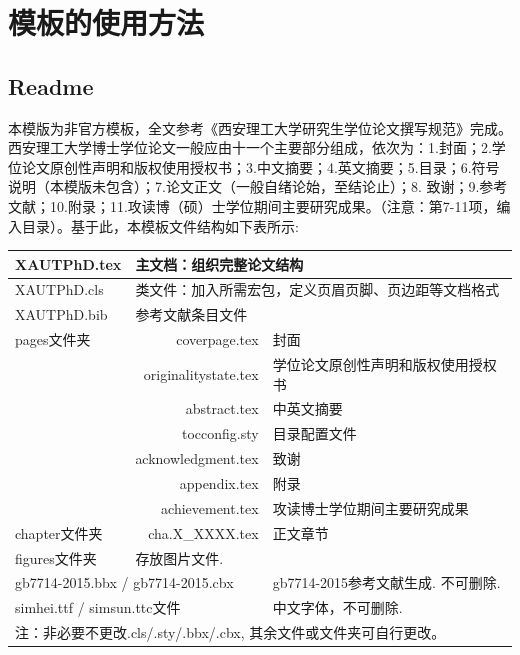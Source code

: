 
\chapter{模板的使用方法}

\section{Readme}
本模版为非官方模板，全文参考《西安理工大学研究生学位论文撰写规范》\cite{r6-1}完成。
西安理工大学博士学位论文一般应由十一个主要部分组成，依次为：1.封面；2.学位论文原创性声明和版权使用授权书；3.中文摘要；4.英文摘要；5.目录；6.符号说明（本模版未包含）；7.论文正文（一般自绪论始，至结论止）；8. 致谢；9.参考文献；10.附录；11.攻读博（硕）士学位期间主要研究成果。（注意：第7-11项，编入目录）。基于此，本模板文件结构如下表所示:

\begin{table}[h]\centering
    \begin{tabularx}{\textwidth}{l|r|l}\hline\hline
        XAUTPhD.tex   & \multicolumn{2}{l}{主文档：组织完整论文结构}\\\hline
        XAUTPhD.cls   & \multicolumn{2}{l}{类文件：加入所需宏包，定义页眉页脚、页边距等文档格式}\\\hline
        XAUTPhD.bib   & \multicolumn{2}{l}{参考文献条目文件}\\\hline
        pages文件夹    & coverpage.tex         & 封面       \\
                      & originalitystate.tex  & 学位论文原创性声明和版权使用授权书  \\
                      & abstract.tex          & 中英文摘要  \\
                      & tocconfig.sty         & 目录配置文件\\
                      & acknowledgment.tex    & 致谢       \\
                      & appendix.tex          & 附录       \\
                      & achievement.tex       & 攻读博士学位期间主要研究成果    \\\hline
        chapter文件夹  & cha.X\_XXXX.tex       & 正文章节    \\\hline  
        figures文件夹  & \multicolumn{2}{l}{存放图片文件.}\\\hline
        \multicolumn{2}{l|}{gb7714-2015.bbx / gb7714-2015.cbx} &  gb7714-2015参考文献生成. 不可删除.\\ \hline 
        \multicolumn{2}{l|}{simhei.ttf / simsun.ttc文件}     &  中文字体，不可删除.\\ \hline \hline
        \multicolumn{3}{l}{注：非必要不更改.cls/.sty/.bbx/.cbx, 其余文件或文件夹可自行更改。}\\
\end{tabularx}
\end{table}

